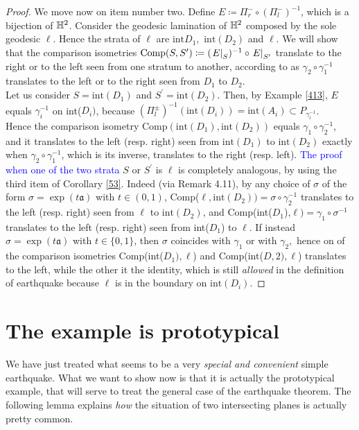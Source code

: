 \begin{proof}
 We move now on item number two. Define $E\coloneqq\Pi_r^-\circ(\Pi_l^-)^{-1}$, which is a bijection of $\mathbb{H}^2$. Consider the geodesic lamination of $\mathbb{H}^2$ composed by the sole geodesic $\ell.$ Hence the strata of $\ell$ are $\text{int}{D_1},$ $\text{int}(D_2)$ and $\ell$. We will show that the comparison isometries $\text{Comp}(S,S^{\prime})\coloneqq(\left.E\right|_{S})^{-1}\circ\left.E\right|_{S^{\prime}}$ translate to the right or to the left seen from one stratum to another, according to as $ \gamma_2\circ\gamma_1^{-1}$ translates to the left or to the right seen from $D_1$ to $D_2$.\\
 Let us consider $S=\text{int}(D_1)$ and $S^{\prime}=\text{int}(D_2)$. Then, by Example \ref{413}, $E$ equals $\gamma_i^{-1}$ on int($D_i)$, because $(\Pi_l^\pm)^{-1}(\text{int}(D_i))=\text{int}(A_i)\subset P_{\gamma_i^{-1}}$. \\
 Hence the comparison isometry $\text{Comp}(\text{int}(D_1),\text{int}(D_2))$ equals $\gamma_1\circ\gamma_2^{-1}$, and it translates to the left (resp. right) seen from $\text{int}(D_1)$ to $\text{int}(D_2)$ exactly when $\gamma_2\circ\gamma_1^{-1}$, which is its inverse, translates to the right (resp. left).  
 \textcolor{blue}{The proof when one of the two strata} $S$ or $S^{\prime}$ is $\ell$ is completely analogous, by using the third item of Corollary \ref{53}. Indeed (via Remark 4.11), by any choice of $\sigma$ of the form $\sigma=\exp(t\mathfrak{a})$ with $t\in(0,1)$, Comp($\ell,\text{int}(D_2))=\sigma\circ\gamma_2^{-1}$ translates to the left (resp. right) seen from $\ell$ to $\text{int}(D_2)$, and Comp(int($D_1$),$\ell)=\gamma_1\circ\sigma^{-1}$ translates to the left (resp. right) seen from int($D_1$) to $\ell.$ If instead $\sigma=\exp(t\mathfrak{a})$ with $t\in\{0,1\}$, then $\sigma$ coincides with $\gamma_1$ or with $\gamma_2,$ hence on of the comparison isometries Comp(int($D_1),\ell$) and Comp(int($D,2),\ell$) translates to the left, while the other it the identity, which is still \textit{allowed} in the definition of earthquake because $\ell$ is in the boundary on $\text{int}(D_i)$.
\end{proof}

\section{The example is prototypical} We have just treated what seems to be a very \textit{special and convenient} simple earthquake. What we want to show now is that it is actually the prototypical example, that will serve to treat the general case of the earthquake theorem. The following lemma explains \textit{how} the situation of two intersecting planes is actually pretty common. 

